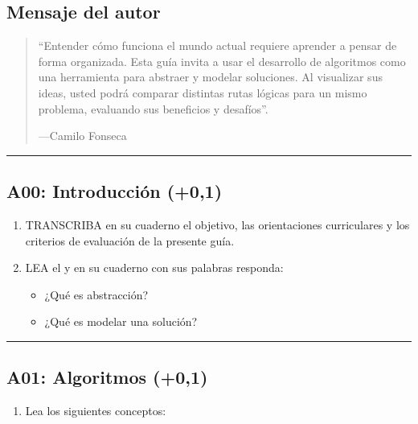 \documentclass[letterpaper,10pt,spanish]{sphinxmanual}
\begin{document}
\subsection{Mensaje del autor}
\label{\detokenize{1_guias/10programacion/G1023:mensaje-del-autor}}\begin{quote}

\sphinxAtStartPar
“Entender cómo funciona el mundo actual requiere aprender a pensar de forma organizada. Esta guía invita a usar el desarrollo de algoritmos como una herramienta para abstraer y modelar soluciones. Al visualizar sus ideas, usted podrá comparar distintas rutas lógicas para un mismo problema, evaluando sus beneficios y desafíos”.

\begin{flushright}
---Camilo Fonseca
\end{flushright}
\end{quote}


\bigskip\hrule\bigskip



\subsection{A00: Introducción (+0,1)}
\label{\detokenize{1_guias/10programacion/G1023:a00-introduccion-0-1}}
\sphinxAtStartPar
{}
\begin{enumerate}
%
\item {} 
\sphinxAtStartPar
TRANSCRIBA en su cuaderno el objetivo, las orientaciones curriculares y los criterios de evaluación de la presente guía.

\item {} 
\sphinxAtStartPar
LEA el  y en su cuaderno con sus palabras responda:
\begin{itemize}
\item {} 
\sphinxAtStartPar
¿Qué es abstracción?

\item {} 
\sphinxAtStartPar
¿Qué es modelar una solución?

\end{itemize}

\end{enumerate}


\bigskip\hrule\bigskip



\subsection{A01: Algoritmos (+0,1)}
\label{\detokenize{1_guias/10programacion/G1023:a01-algoritmos-0-1}}
\sphinxAtStartPar
{}
\begin{enumerate}
%
\item {} 
\sphinxAtStartPar
Lea los siguientes conceptos:

\end{enumerate}
\end{document}
